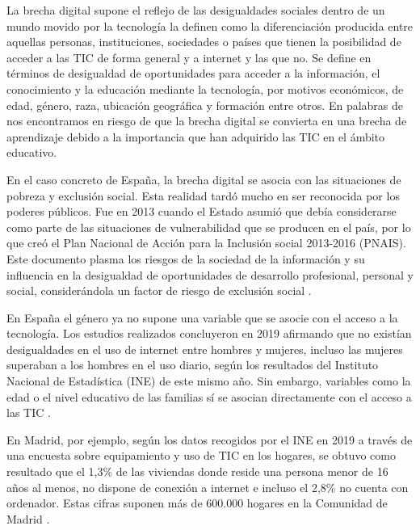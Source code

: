 \documentclass{textolivre}
\begin{document}
La brecha digital supone el reflejo de las desigualdades sociales dentro de un mundo  movido por la tecnología \textcite{caberoalmenara2017} la definen como la diferenciación producida entre aquellas personas, instituciones, sociedades o países que tienen la posibilidad de acceder a las TIC de forma general y a internet y las que no. Se define en términos de desigualdad de oportunidades para acceder a la información, el conocimiento y la educación mediante la tecnología, por motivos económicos, de edad, género, raza, ubicación geográfica y formación entre otros. En palabras de \textcite{cervantesholguin2020} nos encontramos en riesgo de que la brecha digital se convierta en una brecha de aprendizaje debido a la importancia que han adquirido las TIC en el ámbito educativo.

En el caso concreto de España, la brecha digital se asocia con las situaciones de pobreza y exclusión social. Esta realidad tardó mucho en ser reconocida por los poderes públicos. Fue en 2013 cuando el Estado asumió que debía considerarse como parte de las situaciones de vulnerabilidad que se producen en el país, por lo que creó el Plan Nacional de Acción para la Inclusión social 2013-2016 (PNAIS). Este documento plasma los riesgos de la sociedad de la información y su influencia en la desigualdad de oportunidades de desarrollo profesional, personal y social, considerándola un factor de riesgo de exclusión social \cite{rodiciogarcia2020}.

En España el género ya no supone una variable que se asocie con el acceso a la tecnología. Los estudios realizados concluyeron en 2019 afirmando que no existían desigualdades en el uso de internet entre hombres y mujeres, incluso las mujeres superaban a los hombres en el uso diario, según los resultados del Instituto Nacional de Estadística (INE) de este mismo año. Sin embargo, variables como la edad o el nivel educativo de las familias sí se asocian directamente con el acceso a las TIC \cite{acosta2020}.

En Madrid, por ejemplo, según los datos recogidos por el INE en 2019 a través de una encuesta sobre equipamiento y uso de TIC en los hogares, se obtuvo como resultado que el 1,3\% de las viviendas donde reside una persona menor de 16 años al menos, no dispone de conexión a internet e incluso el 2,8\% no cuenta con ordenador. Estas cifras suponen más de 600.000 hogares en la Comunidad de Madrid \cite{martinezlopez2020}.
\end{document}
